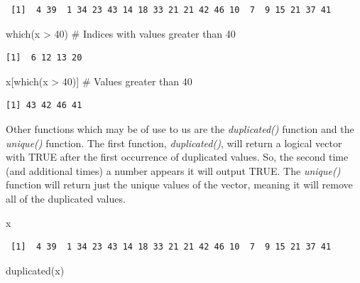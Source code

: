 \documentclass[
  letterpaper,
  DIV=11,
  numbers=noendperiod]{scrreprt}
\newenvironment{Shaded}{\begin{snugshade}}{\end{snugshade}}
\newcommand{\CommentTok}[1]{\textcolor[rgb]{0.37,0.37,0.37}{#1}}
\newcommand{\DecValTok}[1]{\textcolor[rgb]{0.68,0.00,0.00}{#1}}
\newcommand{\FunctionTok}[1]{\textcolor[rgb]{0.28,0.35,0.67}{#1}}
\newcommand{\NormalTok}[1]{\textcolor[rgb]{0.00,0.23,0.31}{#1}}
\newcommand{\SpecialCharTok}[1]{\textcolor[rgb]{0.37,0.37,0.37}{#1}}
\begin{document}
\begin{verbatim}
 [1]  4 39  1 34 23 43 14 18 33 21 21 42 46 10  7  9 15 21 37 41
\end{verbatim}

\begin{Shaded}
\begin{Highlighting}[]
\FunctionTok{which}\NormalTok{(x }\SpecialCharTok{\textgreater{}} \DecValTok{40}\NormalTok{) }\CommentTok{\# Indices with values greater than 40}
\end{Highlighting}
\end{Shaded}

\begin{verbatim}
[1]  6 12 13 20
\end{verbatim}

\begin{Shaded}
\begin{Highlighting}[]
\NormalTok{x[}\FunctionTok{which}\NormalTok{(x }\SpecialCharTok{\textgreater{}} \DecValTok{40}\NormalTok{)] }\CommentTok{\# Values greater than 40}
\end{Highlighting}
\end{Shaded}

\begin{verbatim}
[1] 43 42 46 41
\end{verbatim}

Other functions which may be of use to us are the \emph{duplicated()}
function and the \emph{unique()} function. The first function,
\emph{duplicated()}, will return a logical vector with TRUE after the
first occurrence of duplicated values. So, the second time (and
additional times) a number appears it will output TRUE. The
\emph{unique()} function will return just the unique values of the
vector, meaning it will remove all of the duplicated values.

\begin{Shaded}
\begin{Highlighting}[]
\NormalTok{x}
\end{Highlighting}
\end{Shaded}

\begin{verbatim}
 [1]  4 39  1 34 23 43 14 18 33 21 21 42 46 10  7  9 15 21 37 41
\end{verbatim}

\begin{Shaded}
\begin{Highlighting}[]
\FunctionTok{duplicated}\NormalTok{(x)}
\end{Highlighting}
\end{Shaded}
\end{document}
